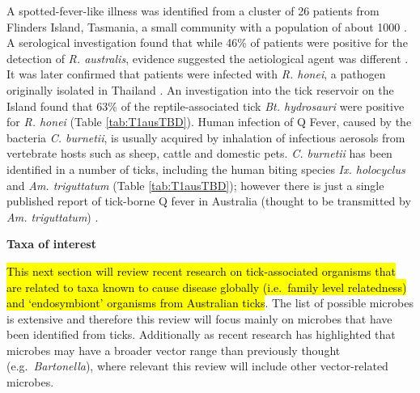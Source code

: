 \documentclass[a4paper, nobind]{templates/ociamthesis}
\begin{document}
A spotted-fever-like illness was identified from a cluster of 26 patients from Flinders Island, Tasmania, a small community with a population of about 1000 \autocite{stewartFlindersIslandSpotted1991}.
A serological investigation found that while 46\% of patients were positive for the detection of \emph{R. australis}, evidence suggested the aetiological agent was different \autocite{gravesSpottedFeverGroup1993}.
It was later confirmed that patients were infected with \emph{R. honei}, a pathogen originally isolated in Thailand \autocite{gravesRickettsiaHonei2003}.
An investigation into the tick reservoir on the Island found that 63\% of the reptile-associated tick \emph{Bt. hydrosauri} were positive for \emph{R. honei} \autocite{stenosAponommaHydrosauriReptileassociated2003} (Table \ref{tab:T1ausTBD}).
Human infection of Q Fever, caused by the bacteria \emph{C. burnetii}, is usually acquired by inhalation of infectious aerosols from vertebrate hosts such as sheep, cattle and domestic pets.
\emph{C. burnetii} has been identified in a number of ticks, including the human biting species \emph{Ix. holocyclus} \autocite{gravesIxodesHolocyclusTicktransmitted2016} and \emph{Am. triguttatum} \autocite{popeCoxiellaBurnetiKangaroos1960,cooperSerologicalEvidenceCoxiella2012} (Table \ref{tab:T1ausTBD}); however there is just a single published report of tick-borne Q fever in Australia (thought to be transmitted by \emph{Am. triguttatum}) \autocite{beamanPericarditisAssociatedTickborne1989}.

\newpage

\textbf{Taxa of interest}

\hl{This next section will review recent research on tick-associated organisms that are related to taxa known to cause disease globally (i.e.~family level relatedness) and `endosymbiont' organisms from Australian ticks}.
The list of possible microbes is extensive and therefore this review will focus mainly on microbes that have been identified from ticks.
Additionally as recent research has highlighted that microbes may have a broader vector range than previously thought (e.g.~\emph{Bartonella}), where relevant this review will include other vector-related microbes.
\end{document}

